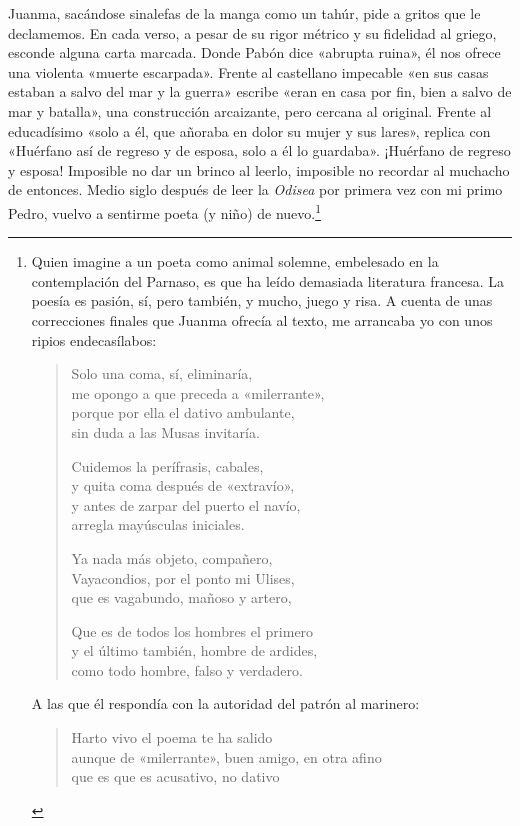 Juanma, sacándose sinalefas de la manga como un tahúr, pide a gritos que le declamemos. En cada verso, a pesar de su rigor métrico y su fidelidad al griego, esconde alguna carta marcada. Donde Pabón dice «abrupta ruina», él nos ofrece una violenta «muerte escarpada». Frente al castellano impecable «en sus casas estaban a salvo del mar y la guerra» escribe «eran en casa por fin, bien a salvo de mar y batalla», una construcción arcaizante, pero cercana al original. Frente al educadísimo «solo a él, que añoraba en dolor su mujer y sus lares», replica con «Huérfano así de regreso y de esposa, solo a él lo guardaba». ¡Huérfano de regreso y esposa! Imposible no dar un brinco al leerlo, imposible no recordar al muchacho de entonces. Medio siglo después de leer la \emph{Odisea} por primera vez con mi primo Pedro, vuelvo a sentirme poeta (y niño) de nuevo.\footnote{Quien imagine a un poeta como animal solemne, embelesado en la contemplación del Parnaso, es que ha leído demasiada literatura francesa. La poesía es pasión, sí, pero también, y mucho, juego y risa. A cuenta de unas correcciones finales que Juanma ofrecía al texto, me arrancaba yo con unos ripios endecasílabos: 

\begin{verse}
Solo una coma, sí, eliminaría,\\
me opongo a que preceda a «milerrante»,\\
porque por ella el dativo ambulante,\\
sin duda a las Musas invitaría.

Cuidemos la perífrasis, cabales,\\
y quita coma después de «extravío»,\\
y antes de zarpar del puerto el navío,\\
arregla mayúsculas iniciales.

Ya nada más objeto, compañero,\\
Vayacondios, por el ponto mi Ulises,\\
que es vagabundo, mañoso y artero,

Que es de todos los hombres el primero\\
y el último también, hombre de ardides,\\
como todo hombre, falso y verdadero.
\end{verse}

A las que él respondía con la autoridad del patrón al marinero:

\begin{verse}
Harto vivo el poema te ha salido\\
aunque de «milerrante», buen amigo, en otra afino\\
que es que es acusativo, no dativo
\end{verse}}

